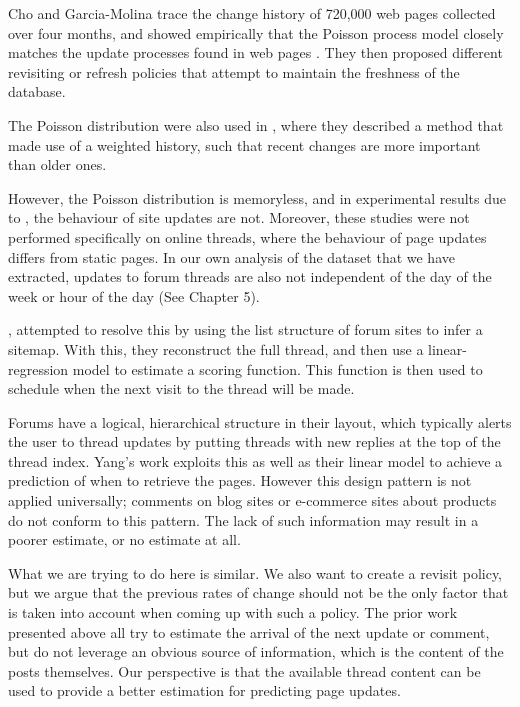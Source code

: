 Cho and Garcia-Molina trace the change history of 720,000 web pages collected 
over four months, and showed empirically that the Poisson process model closely 
matches the update processes found in web pages \cite{Cho1999}. They then 
proposed different revisiting or refresh policies 
\cite{Cho2003,Garcia-molina2003} that attempt to maintain the freshness of the 
database.

The Poisson distribution were also used in , where they 
described a method that made use of a weighted history, such that recent changes 
are more important than older ones. 

However, the Poisson distribution is memoryless, and in experimental results due 
to , the behaviour of site updates are not. Moreover, these 
studies were not performed specifically on online threads, where the behaviour 
of page updates differs from static pages. In our own analysis of the dataset 
that we have extracted, updates to forum threads are also not independent of the 
day of the week or hour of the day (See Chapter 5).

, attempted to resolve this by using the list structure of 
forum sites to infer a sitemap. With this, they reconstruct the full thread, and 
then use a linear-regression model to estimate a scoring function. This function 
is then used to schedule when the next visit to the thread will be made.  

Forums have a logical, hierarchical structure in their layout, which typically 
alerts the user to thread updates by putting threads with new replies at the top 
of the thread index. Yang's work exploits this as well as their linear model to 
achieve a prediction of when to retrieve the pages.  However this design pattern 
is not applied universally; comments on blog sites or e-commerce sites about 
products do not conform to this pattern.  The lack of such information may 
result in a poorer estimate, or no estimate at all.

What we are trying to do here is similar. We also want to create a revisit 
policy, but we argue that the previous rates of change should not be the only 
factor that is taken into account when coming up with such a policy. The prior 
work presented above all try to estimate the arrival of the next update or 
comment, but do not leverage an obvious source of information, which is the 
content of the posts themselves. Our perspective is that the available thread 
content can be used to provide a better estimation for predicting page updates. 

